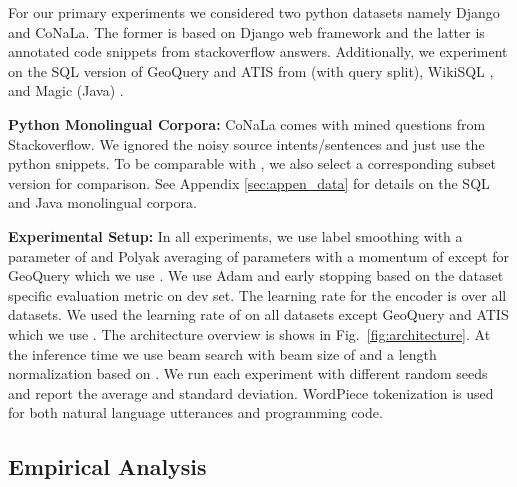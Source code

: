 For our primary experiments we considered two python datasets namely Django and CoNaLa. The former is based on Django web framework and the latter is annotated code snippets from stackoverflow answers. Additionally, we experiment on the SQL version of GeoQuery and ATIS from \citet{finegan2018improving} (with query split), WikiSQL \cite{zhong2017seq2sql}, and Magic (Java) \cite{ling2016latent}.


\textbf{Python Monolingual Corpora:} CoNaLa comes with  mined questions from Stackoverflow. We ignored the noisy source intents/sentences and just use the python snippets. To be comparable with \citet{xu2020incorporating}, we also select a corresponding  subset version for comparison. See Appendix \ref{sec:appen_data} for details on the SQL and Java monolingual corpora. 


\textbf{Experimental Setup:} In all experiments, we use label smoothing with a parameter of  and Polyak averaging \cite{polyak1992acceleration} of parameters with a momentum of  except for GeoQuery which we use . We use Adam \cite{kingma2014adam} and early stopping based on the dataset specific evaluation metric on dev set. The learning rate for the encoder is  over all datasets. We used the learning rate of  on all datasets except GeoQuery and ATIS which we use . The architecture overview is shows in Fig.\ \ref{fig:architecture}. 
At the inference time we use beam search with beam size of  and a length normalization based on \cite{Wu2016GooglesNM}. We run each experiment with  different random seeds and report the average and standard deviation. WordPiece tokenization is used for both natural language utterances and programming code.










\vspace{-0.1em}
\subsection{Empirical Analysis}
\vspace{-0.1em}
\label{sec:ablation}



